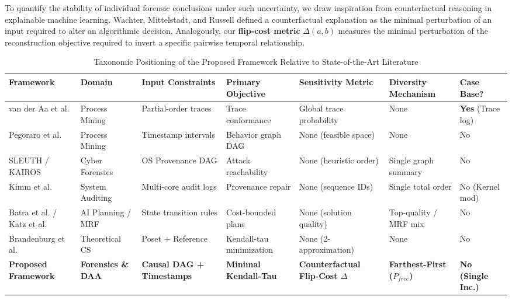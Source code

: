 \documentclass[journal]{IEEEtran}
\begin{document}
To quantify the stability of individual forensic conclusions under such uncertainty, we draw inspiration from counterfactual reasoning in explainable machine learning. Wachter, Mittelstadt, and Russell \cite{Wachter2018} defined a counterfactual explanation as the minimal perturbation of an input required to alter an algorithmic decision. Analogously, our \textbf{flip-cost metric} $\Delta(a, b)$ measures the minimal perturbation of the reconstruction objective required to invert a specific pairwise temporal relationship.

\begin{table}[t]
\caption{Taxonomic Positioning of the Proposed Framework Relative to State-of-the-Art Literature}
\label{tab:taxonomy}
\centering
\begin{tabular}{@{}lllllll@{}}
\toprule
\textbf{Framework} & \textbf{Domain} & \textbf{Input Constraints} & \textbf{Primary Objective} & \textbf{Sensitivity Metric} & \textbf{Diversity Mechanism} & \textbf{Case Base?} \\
\midrule
van der Aa et al. \cite{vanderAa2020} & Process Mining & Partial-order traces & Trace conformance & Global trace probability & None & \textbf{Yes} (Trace log) \\
Pegoraro et al. \cite{Pegoraro2020a} & Process Mining & Timestamp intervals & Behavior graph DAG & None (feasible space) & None & No \\
SLEUTH / KAIROS \cite{Hossain2017, Cheng2024} & Cyber Forensics & OS Provenance DAG & Attack reachability & None (heuristic order) & Single graph summary & No \\
Kimm et al. \cite{Kimm2026} & System Auditing & Multi-core audit logs & Provenance repair & None (sequence IDs) & Single total order & No (Kernel mod) \\
Batra et al. / Katz et al. \cite{Batra2012, Katz2020} & AI Planning / MRF & State transition rules & Cost-bounded plans & None (solution quality) & Top-quality / MRF mix & No \\
Brandenburg et al. \cite{Brandenburg2011} & Theoretical CS & Poset + Reference & Kendall-tau minimization & None (2-approximation) & None & No \\
\textbf{Proposed Framework} & \textbf{Forensics \& DAA} & \textbf{Causal DAG + Timestamps} & \textbf{Minimal Kendall-Tau} & \textbf{Counterfactual Flip-Cost $\Delta$} & \textbf{Farthest-First ($P_{free}$)} & \textbf{No (Single Inc.)} \\
\bottomrule
\end{tabular}
\end{table}
\end{document}

